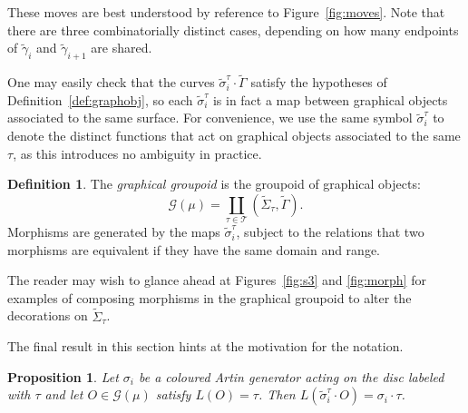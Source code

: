 \documentclass{amsart}
\newtheorem{proposition}[theorem]{Proposition}
\theoremstyle{definition}
\newtheorem{definition}[theorem]{Definition}
\def\ws{\widetilde{\Sigma}}
\begin{document}
These moves are best understood by reference to Figure~\ref{fig:moves}. Note that there are three combinatorially distinct cases, depending on how many endpoints of $\widetilde{\gamma}_{i}$ and $\widetilde{\gamma}_{i+1}$ are shared.


  
  
One may easily check that the curves $\widetilde{\sigma}^\tau_i\cdot \widetilde{\Gamma}$ satisfy the hypotheses of Definition~\ref{def:graphobj}, so each $\widetilde{\sigma}^\tau_i$ is in fact a map between graphical objects associated to the same surface.   For convenience, we use the same symbol $\widetilde{\sigma}^\tau_i$ to denote the distinct functions that act on graphical objects associated to the same $\tau$,  as this introduces no ambiguity in practice. 

\begin{definition}\label{def:grgr} The \textit{graphical groupoid}  is the groupoid of graphical objects: \[\mathcal{G}(\mu)=\coprod_{\tau\in \mathcal{T}} (\ws_\tau, \widetilde{\Gamma}).\]  Morphisms are generated by the maps $\widetilde{\sigma}^\tau_i$, subject to the relations that two morphisms are equivalent if they have the same domain and range.  
\end{definition}

The reader may wish to glance ahead at Figures~\ref{fig:s3} and \ref{fig:morph} for examples of composing morphisms in the graphical groupoid to alter the decorations on $\ws_\tau$.  

The final result in this section hints at the motivation for the notation.

\begin{proposition}\label{prop:comp} 
Let $\sigma_i$ be a coloured Artin generator acting on the disc labeled with $\tau$ and let $O \in \mathcal{G}(\mu)$ satisfy $L(O)=\tau$. Then $L(\widetilde{\sigma}^\tau_i\cdot O)=\sigma_i\cdot \tau$.  
\end{proposition}
\end{document}
